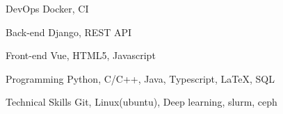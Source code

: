 

\begin{cvskills}

  \cvskill
    {DevOps} %
    {Docker, CI} %

  \cvskill
    {Back-end} %
    {Django, REST API} %

  \cvskill
    {Front-end} %
    {Vue, HTML5, Javascript} %

  \cvskill
    {Programming} %
    {Python, C/C++, Java, Typescript, LaTeX, SQL} %

  \cvskill
    {Technical Skills}
    {Git, Linux(ubuntu), Deep learning, slurm, ceph}

\end{cvskills}
